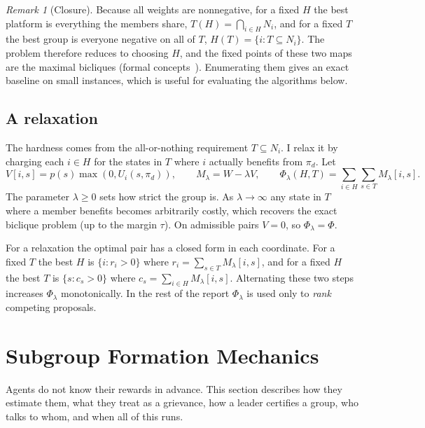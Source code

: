 \documentclass[11pt]{article}
\theoremstyle{plain}
\theoremstyle{definition}
\theoremstyle{remark}
\newtheorem{remark}[theorem]{Remark}
\begin{document}
\begin{remark}[Closure]
Because all weights are nonnegative, for a fixed $H$ the best platform is everything the members share, $T(H)=\bigcap_{i\in H}N_i$,
and for a fixed $T$ the best group is everyone negative on all of $T$, $H(T)=\{i: T\subseteq N_i\}$. The problem therefore reduces to choosing $H$,
and the fixed points of these two maps are the maximal bicliques (formal concepts~\cite{fca}).
Enumerating them gives an exact baseline on small instances, which is useful for evaluating the algorithms below.
\end{remark}
 
\subsection{A relaxation}
The hardness comes from the all-or-nothing requirement $T \subseteq N_i$. I relax it by charging each $i \in H$ for the states in $T$
where $i$ actually benefits from $\pi_d$. Let
\[ V[i, s] = p(s)\max(0, U_i(s, \pi_d)), \qquad M_\lambda = W - \lambda V, \qquad
\Phi_\lambda(H, T) = \sum_{i \in H}\sum_{s \in T}M_\lambda[i, s]. \]
The parameter $\lambda\ge 0$ sets how strict the group is. As $\lambda \to \infty$ any state in $T$ where a member benefits becomes arbitrarily costly, which recovers
the exact biclique problem (up to the margin $\tau$). On admissible pairs $V = 0$, so $\Phi_\lambda = \Phi$.
 
For a relaxation the optimal pair has a closed form in each coordinate. For a fixed $T$ the best $H$ is $\{ i: r_i > 0 \}$ where
$r_i = \sum_{s \in T}M_\lambda[i, s]$, and for a fixed $H$ the best $T$ is $\{ s : c_s > 0 \}$ where $c_s = \sum_{i \in H}M_\lambda[i, s]$.
Alternating these two steps increases $\Phi_\lambda$ monotonically. In the rest of the report $\Phi_\lambda$ is used only to \emph{rank} competing proposals.
 
\section{Subgroup Formation Mechanics}\label{sec:mech}
Agents do not know their rewards in advance. This section describes how they estimate them, what they treat as a grievance,
how a leader certifies a group, who talks to whom, and when all of this runs.
 
\end{document}

